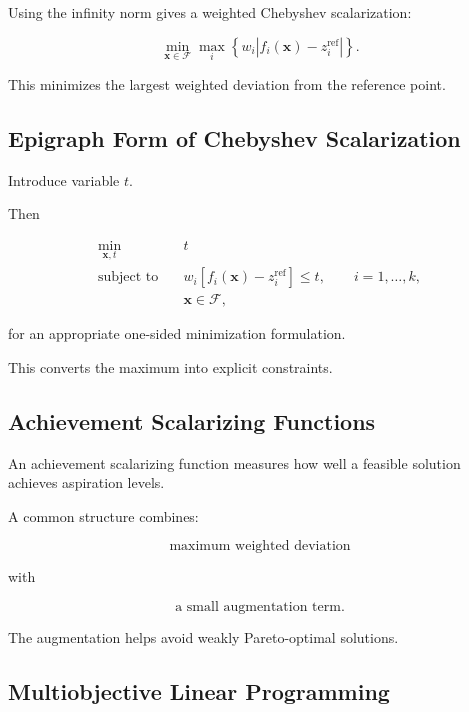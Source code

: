 Using the infinity norm gives a weighted Chebyshev scalarization:

\[
\boxed{
\min_{\mathbf{x}\in\mathcal{F}}
\max_i
\left\{
w_i
\left|
f_i(\mathbf{x})
-
z_i^{\mathrm{ref}}
\right|
\right\}.
}
\]

This minimizes the largest weighted deviation from the reference point.

\subsection{Epigraph Form of Chebyshev Scalarization}
\label{subsec:chebyshev-epigraph}

Introduce variable \(t\).

Then

\[
\boxed{
\begin{aligned}
\min_{\mathbf{x},t}
\quad&
t
\\
\text{subject to}
\quad&
w_i
\left[
f_i(\mathbf{x})
-
z_i^{\mathrm{ref}}
\right]
\leq
t,
\qquad
i=1,\ldots,k,
\\
&
\mathbf{x}\in\mathcal{F},
\end{aligned}
}
\]

for an appropriate one-sided minimization formulation.

This converts the maximum into explicit constraints.

\subsection{Achievement Scalarizing Functions}
\label{subsec:achievement-scalarizing-functions}

An achievement scalarizing function measures how well a feasible solution
achieves aspiration levels.

A common structure combines:

\[
\boxed{
\text{maximum weighted deviation}
}
\]

with

\[
\boxed{
\text{a small augmentation term}.
}
\]

The augmentation helps avoid weakly Pareto-optimal solutions.

\subsection{Multiobjective Linear Programming}
\label{subsec:multiobjective-linear-programming}

